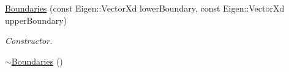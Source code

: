 \begin{DoxyCompactItemize}
\item 
\hyperlink{structtudat_1_1optimization_1_1Boundaries_a3850c0d2eb04b13e20cd9b7b7fdb5cdf}{Boundaries} (const Eigen\+::\+Vector\+Xd lower\+Boundary, const Eigen\+::\+Vector\+Xd upper\+Boundary)
\begin{DoxyCompactList}\small\item\em Constructor. \end{DoxyCompactList}\item 
\hyperlink{structtudat_1_1optimization_1_1Boundaries_a6bb7ebeca76f179679010a1fdcac154b}{$\sim$\+Boundaries} ()\hypertarget{structtudat_1_1optimization_1_1Boundaries_a6bb7ebeca76f179679010a1fdcac154b}{}\label{structtudat_1_1optimization_1_1Boundaries_a6bb7ebeca76f179679010a1fdcac154b}


\end{DoxyCompactItemize}
